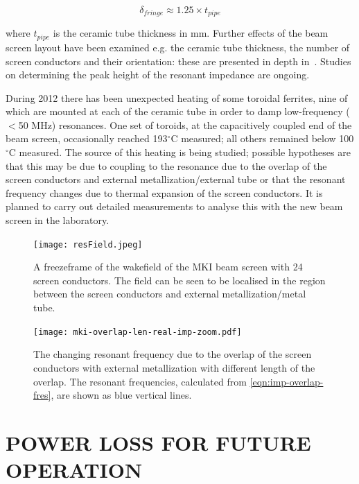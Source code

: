 \documentclass{JAC2003}
\begin{document}
\begin{equation}
\delta_{fringe} \approx 1.25 \times t_{pipe}
\end{equation}

where $t_{pipe}$ is the ceramic tube thickness in mm. Further effects of the beam screen layout have been examined e.g. the ceramic tube thickness, the number of screen conductors and their orientation: these are presented in depth in~\cite{DayThesis}. Studies on determining the peak height of the resonant impedance are ongoing. 

During 2012 there has been unexpected heating of some toroidal ferrites, nine of which are mounted at each of the ceramic tube in order to damp low-frequency ($<$50 MHz) resonances. One set of toroids, at the capacitively coupled end of the beam screen, occasionally reached 193$^{\circ}$C measured; all others remained below 100$^{\circ}$C measured. The source of this heating is being studied; possible hypotheses are that this may be due to coupling to the resonance due to the overlap of the screen conductors and external metallization/external tube or that the resonant frequency changes due to thermal expansion of the screen conductors. It is planned to carry out detailed measurements to analyse this with the new beam screen in the laboratory.

\begin{figure}
\texttt{[image: resField.jpeg]}
\caption{A freezeframe of the wakefield of the MKI beam screen with 24 screen conductors. The field can be seen to be localised in the region between the screen conductors and external metallization/metal tube.}
\label{fig:mkiResFieldPat}
\end{figure}

\begin{figure}
\begin{center}
\texttt{[image: mki-overlap-len-real-imp-zoom.pdf]}
\caption{The changing resonant frequency due to the overlap of the screen conductors with external metallization with different length of the overlap. The resonant frequencies, calculated from \ref{eqn:imp-overlap-fres}, are shown as blue vertical lines.}
\label{fig:mkiOverlapRes}
\end{center}
\end{figure}

\section{POWER LOSS FOR FUTURE OPERATION}
\end{document}
